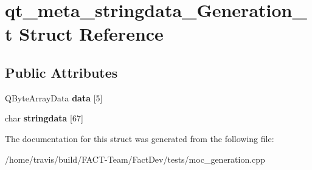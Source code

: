 \hypertarget{structqt__meta__stringdata__Generation__t}{\section{qt\-\_\-meta\-\_\-stringdata\-\_\-\-Generation\-\_\-t Struct Reference}
\label{structqt__meta__stringdata__Generation__t}
}
\subsection*{Public Attributes}
\begin{DoxyCompactItemize}
\item 
\hypertarget{structqt__meta__stringdata__Generation__t_aef2d917116f839ac00eb505e94d51807}{Q\-Byte\-Array\-Data {\bfseries data} \mbox{[}5\mbox{]}}\label{structqt__meta__stringdata__Generation__t_aef2d917116f839ac00eb505e94d51807}

\item 
\hypertarget{structqt__meta__stringdata__Generation__t_ad773d21eae1fec4ea413ce6dfb141d50}{char {\bfseries stringdata} \mbox{[}67\mbox{]}}\label{structqt__meta__stringdata__Generation__t_ad773d21eae1fec4ea413ce6dfb141d50}

\end{DoxyCompactItemize}


The documentation for this struct was generated from the following file\-:\begin{DoxyCompactItemize}
\item 
/home/travis/build/\-F\-A\-C\-T-\/\-Team/\-Fact\-Dev/tests/moc\-\_\-generation.\-cpp\end{DoxyCompactItemize}
